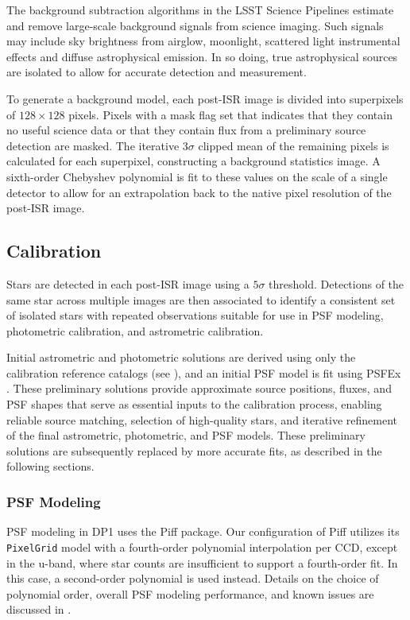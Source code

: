 The background subtraction algorithms in the \gls{LSST Science Pipelines} estimate and remove large-scale background signals from science imaging.
Such signals may include sky brightness from airglow, moonlight, scattered light instrumental effects and diffuse astrophysical emission.
In so doing, true astrophysical sources are isolated to allow for accurate detection and measurement.

To generate a \gls{background} model, each post-ISR image is divided into superpixels of $128\times128$ pixels.
Pixels with a mask flag set that indicates that they contain no useful science data or that they contain \gls{flux} from a preliminary source detection are masked.
The iterative $3\sigma$ clipped mean of the remaining pixels is calculated for each superpixel, constructing a \gls{background} statistics image.
A sixth-order Chebyshev polynomial is fit to these values on the scale of a single detector to allow for an extrapolation back to the native pixel resolution of the post-\gls{ISR} image.


\subsection{Calibration}
\label{ssec:drp_calibration}
Stars are detected in each post-\gls{ISR} image using a $5\sigma$ threshold.
Detections of the same star across multiple images are then associated to identify a consistent set of isolated stars with repeated observations suitable for use in PSF modeling, photometric \gls{calibration}, and astrometric \gls{calibration}.

Initial astrometric and photometric solutions are derived using only the calibration reference catalogs (see ), and an initial \gls{PSF} model is fit using PSFEx \citep{2011ASPC..442..435B}.
These preliminary solutions provide approximate source positions, fluxes, and \gls{PSF} shapes that serve as essential inputs to the \gls{calibration} process, enabling reliable source matching, selection of high-quality stars, and iterative refinement of the final astrometric, photometric, and \gls{PSF} models.
These preliminary solutions are subsequently replaced by more accurate fits, as described in the following sections.

\subsubsection{PSF Modeling}
\label{ssec:psf_modelling}
\gls{PSF} modeling in \gls{DP1} uses the Piff \citep{DES:2020vau} package.
Our configuration of Piff utilizes its \texttt{PixelGrid} model with a fourth-order polynomial interpolation per \gls{CCD}, except in the u-band, where star counts are insufficient to support a fourth-order fit.
In this case, a second-order polynomial is used instead.
Details on the choice of polynomial order, overall \gls{PSF} modeling performance, and known issues are discussed in .

